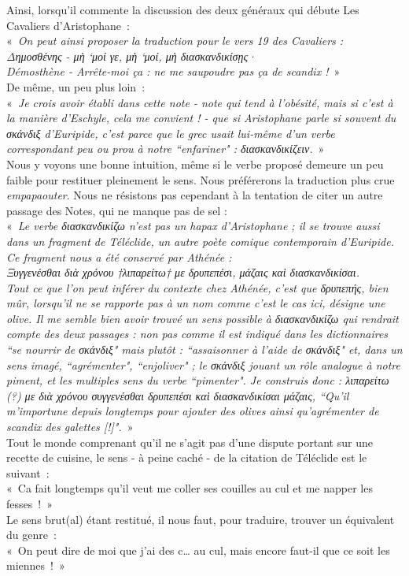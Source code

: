 \documentclass{book}%
\newcommand{\italique}[1]{\textit{#1}}%
\begin{document}
Ainsi, lorsqu’il commente la discussion des deux généraux qui débute Les Cavaliers d’Aristophane :\\
« \italique{On peut ainsi proposer la traduction pour le vers 19 des Cavaliers :\\
Δημοσθένης - μὴ ‘μοί γε, μὴ ‘μοί, μὴ διασκανδικίσῃς·\\
Démosthène - Arrête-moi ça : ne me saupoudre pas ça de scandix !} »\\
De même, un peu plus loin :\\
« \italique{Je crois avoir établi dans cette note - note qui tend à l’obésité, mais si c’est à la manière d’Eschyle, cela me convient ! - que si Aristophane parle si souvent du σκάνδιξ d’Euripide, c’est parce que le grec usait lui-même d’un verbe correspondant peu ou prou à notre ``enfariner" : διασκανδικίζειν.} » \\
Nous y voyons une bonne intuition, même si le verbe proposé demeure un peu faible pour restituer pleinement le sens. Nous préférerons la traduction plus crue \italique{empapaouter}. 
Nous ne résistons pas cependant à la tentation de citer un autre passage des Notes, qui ne manque pas de sel : \\
« \italique{Le verbe διασκανδικίζω n’est pas un hapax d’Aristophane ; il se trouve aussi dans un fragment de Téléclide, un autre poète comique contemporain d’Euripide. Ce fragment nous a été conservé par Athénée :\\
Ξυγγενέσθαι διὰ χρόνου †λιπαρείτω† με δρυπεπέσι, μάζαις καὶ διασκανδικίσαι.\\
Tout ce que l’on peut inférer du contexte chez Athénée, c’est que δρυπεπής, bien mûr, lorsqu’il ne se rapporte pas à un nom comme c’est le cas ici, désigne une olive. Il me semble bien avoir trouvé un sens possible à διασκανδικίζω qui rendrait compte des deux passages : non pas comme il est indiqué dans les dictionnaires ``se nourrir de σκάνδιξ" mais plutôt : ``assaisonner à l’aide de σκάνδιξ" et, dans un sens imagé, ``agrémenter", ``enjoliver" ; le σκάνδιξ jouant un rôle analogue à notre piment, et les multiples sens du verbe ``pimenter". 
Je construis donc : λιπαρείτω (?) με διὰ χρόνου συγγενέσθαι δρυπεπέσι καὶ διασκανδικίσαι μάζαις, ``Qu’il m’importune depuis longtemps pour ajouter des olives ainsi qu’agrémenter de scandix des galettes [!]".} »\\
Tout le monde comprenant qu’il ne s’agit pas d’une dispute portant sur une recette de cuisine, le sens - à peine caché - de la citation de Téléclide est le suivant :\\
« Ca fait longtemps qu’il veut me coller ses couilles au cul et me napper les fesses ! »\\
Le sens brut(al) étant restitué, il nous faut, pour traduire, trouver un équivalent du genre :\\
« On peut dire de moi que j’ai des c… au cul, mais encore faut-il que ce soit les miennes ! »
\end{document}
